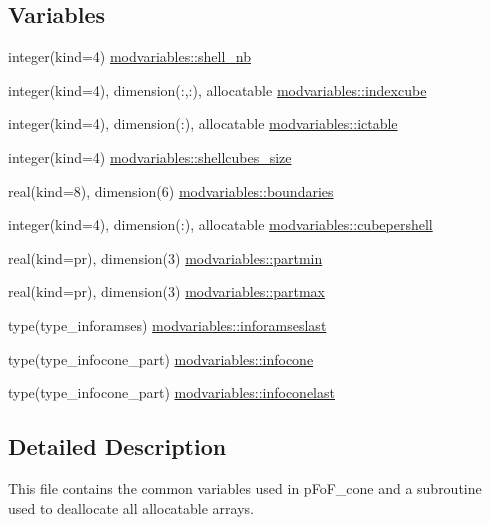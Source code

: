 \subsection*{Variables}
\begin{DoxyCompactItemize}
\item 
integer(kind=4) \hyperlink{namespacemodvariables_a8e749d6e70dade5cb6d75a09a99cefd7}{modvariables\+::shell\+\_\+nb}
\item 
integer(kind=4), dimension(\+:,\+:), allocatable \hyperlink{namespacemodvariables_a46e17f78883958892917ac536b4ab1b1}{modvariables\+::indexcube}
\item 
integer(kind=4), dimension(\+:), allocatable \hyperlink{namespacemodvariables_a2de620524061386e6addabfa15a6b020}{modvariables\+::ictable}
\item 
integer(kind=4) \hyperlink{namespacemodvariables_a9b7ba2cda6114449e99e9f7f348d4c32}{modvariables\+::shellcubes\+\_\+size}
\item 
real(kind=8), dimension(6) \hyperlink{namespacemodvariables_a0dd99db73cadd4dfd2c39cdc09b6da9b}{modvariables\+::boundaries}
\item 
integer(kind=4), dimension(\+:), allocatable \hyperlink{namespacemodvariables_a2c3c2168db3dc7c7b511d9c5a2715de5}{modvariables\+::cubepershell}
\item 
real(kind=pr), dimension(3) \hyperlink{namespacemodvariables_a70ddcf7f533c219df5c249774ff81df1}{modvariables\+::partmin}
\item 
real(kind=pr), dimension(3) \hyperlink{namespacemodvariables_abeabad3e2598f3abb4a4fa74adca7743}{modvariables\+::partmax}
\item 
type(type\+\_\+inforamses) \hyperlink{namespacemodvariables_a0640750979390f0e918c322d27b0bf74}{modvariables\+::inforamseslast}
\item 
type(type\+\_\+infocone\+\_\+part) \hyperlink{namespacemodvariables_a9c451543a6252b72d4a5352333c718b9}{modvariables\+::infocone}
\item 
type(type\+\_\+infocone\+\_\+part) \hyperlink{namespacemodvariables_acecda25ec5fba6f5f5fcaa09b2aba3a2}{modvariables\+::infoconelast}
\end{DoxyCompactItemize}


\subsection{Detailed Description}
This file contains the common variables used in p\+Fo\+F\+\_\+cone and a subroutine used to deallocate all allocatable arrays. 

